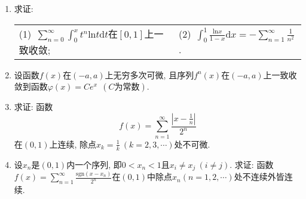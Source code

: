 \begin{enumerate}
\begin{table}[H]
\end{table}
\item 求证:
\begin{table}[H]
	\begin{tabular}{ll}
		(1)\ $\displaystyle{\sum\limits_{n=0}^{\infty}\int_{0}^{x}t^n\mathrm{ln}t\mathrm{d}t}$在$[0,1]$上一致收敛;\qquad \qquad \qquad \qquad \qquad & (2)\ $\displaystyle{\int_{0}^{1}\frac{\mathrm{ln}x}{1-x}\mathrm{d}x=-\sum\limits_{n=1}^{\infty}\frac{1}{n^2}}$.
	\end{tabular}
\end{table}
\item 设函数$f(x)$在$(-a,a)$上无穷多次可微, 且序列$f^n(x)$在$(-a,a)$上一致收敛到函数$\varphi(x)=Ce^x\ \ (C\text{为常数})$.
\item 求证: 函数$$
f(x)=\sum\limits_{n=1}^{\infty}\frac{|x-\frac{1}{n}|}{2^n}$$
在$(0,1)$上连续, 除点$x_k=\frac{1}{k}\ (k=2,3,\cdots)$处不可微.
\item 设$x_n$是$(0,1)$内一个序列, 即$0<x_n<1$且$x_i\ne x_j\ (i\ne j)$. 求证: 函数$f(x)=\sum\limits_{n=1}^{\infty}\frac{\mathrm{sgn}(x-x_n)}{2^n}$在$(0,1)$中除点$x_n(n=1,2,\cdots)$处不连续外皆连续.
\end{enumerate}

